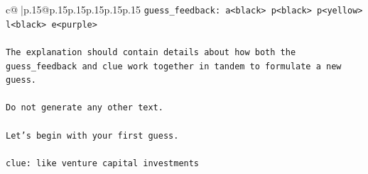 \documentclass{article}
\begin{document}
{\begin{supertabular}{c@{$\;$}|p{.15\linewidth}@{}p{.15\linewidth}p{.15\linewidth}p{.15\linewidth}p{.15\linewidth}p{.15\linewidth}}
{{{\texttt{guess\_feedback: a<black> p<black> p<yellow> l<black> e<purple>} \\
\\ 
\texttt{The explanation should contain details about how both the guess\_feedback and clue work together in tandem to formulate a new guess.} \\
\\ 
\texttt{Do not generate any other text.} \\
\\ 
\texttt{Let's begin with your first guess.} \\
\\ 
\texttt{clue: like venture capital investments} \\
            }
        }
    }
     \\ \\


\end{supertabular}}
\end{document}
